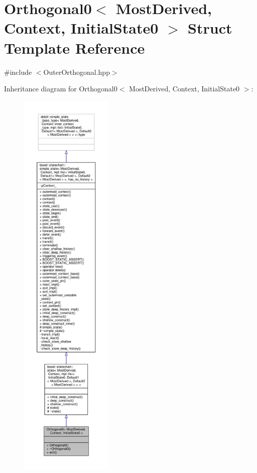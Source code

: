 \hypertarget{struct_orthogonal0}{}\section{Orthogonal0$<$ Most\+Derived, Context, Initial\+State0 $>$ Struct Template Reference}
\label{struct_orthogonal0}


{\ttfamily \#include $<$Outer\+Orthogonal.\+hpp$>$}



Inheritance diagram for Orthogonal0$<$ Most\+Derived, Context, Initial\+State0 $>$\+:
\nopagebreak
\begin{figure}[H]
\begin{center}
\leavevmode
\includegraphics[height=550pt]{struct_orthogonal0__inherit__graph}
\end{center}
\end{figure}


